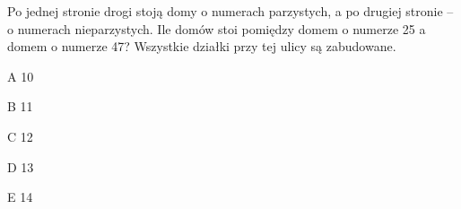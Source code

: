 \begin{tresc}
Po jednej stronie drogi stoją domy o numerach parzystych, a po drugiej stronie – o numerach nieparzystych. Ile domów stoi pomiędzy domem o numerze 25 a domem o numerze 47? Wszystkie działki przy tej ulicy są zabudowane.
\end{tresc}
\begin{wariant}{A} 10 \end{wariant}
\begin{wariant}{B} 11 \end{wariant}
\begin{wariant}{C} 12 \end{wariant}
\begin{wariant}{D} 13 \end{wariant}
\begin{wariant}{E} 14 \end{wariant}
